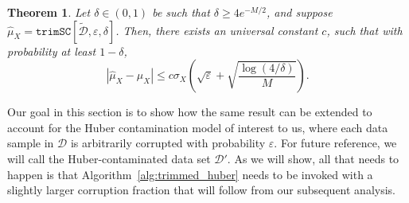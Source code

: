 \documentclass{article}
\newcommand{\mc}{\mathcal}
\newtheorem{theorem}{Theorem}
\begin{document}
\begin{theorem}\citep[Theorem 1]{lugosi} 
\label{thm:lugosi_SC}
 Let $\delta \in (0,1)$ be such that $\delta \geq 4 e^{-M/2}$, and suppose $\hat{\mu}_X = \texttt{trimSC}[\tilde{\mc{D}}, \varepsilon, \delta]$. Then, there exists an universal constant $c$, such that with probability at least $1-\delta$,
\begin{equation}
|\hat{\mu}_X - \mu_X| \leq c\sigma_X\left(\sqrt{\varepsilon}+\sqrt{\frac{\log(4/\delta)}{M}} \right). 
\label{eqn:lugosi_bnd2}
\end{equation}
\end{theorem}

Our goal in this section is to show how the same result can be extended to account for the Huber contamination model of interest to us, where each data sample in $\mc{D}$ is arbitrarily corrupted with probability $\varepsilon.$  For future reference, we will call the Huber-contaminated data set $\mc{D}'$. As we will show, all that needs to happen is that Algorithm~\ref{alg:trimmed_huber} needs to be invoked with a slightly larger corruption fraction that will follow from our subsequent analysis. 
\end{document}
